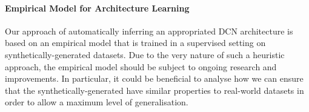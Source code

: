 \paragraph{Empirical Model for Architecture Learning} Our approach of automatically inferring an appropriated DCN architecture is based on an empirical model that is trained in a supervised setting on synthetically-generated datasets. Due to the very nature of such a heuristic approach, the empirical model should be subject to ongoing research and improvements. In particular, it could be beneficial to analyse how we can ensure that the synthetically-generated have similar properties to real-world datasets in order to allow a maximum level of generalisation.  


%



